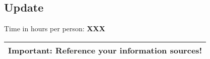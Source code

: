 \documentclass[11pt]{scrartcl}
\begin{document}
\subsection*{Update}

\bigskip

\noindent Time in hours per person: {\bf XXX}

\bigskip

\begin{center}
  \begin{tabular}{c}
    \hline
    {\bf Important:} Reference your information sources!
    \\\hline
  \end{tabular}
\end{center}
\end{document}
